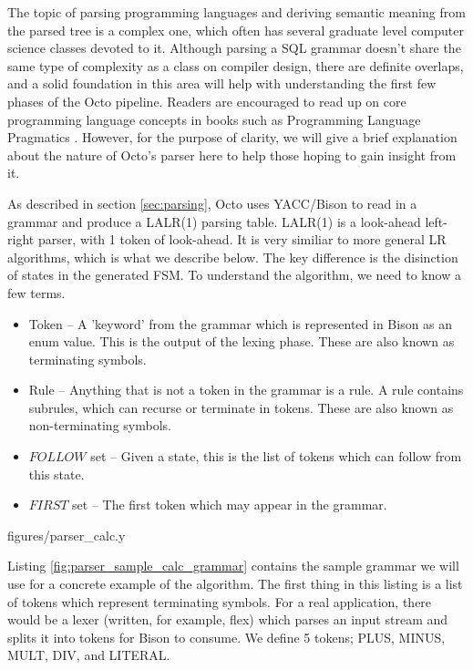 \documentclass[]{article}
\begin{document}
The topic of parsing programming languages and deriving semantic meaning from the parsed tree is a complex one, which often has several graduate level computer science classes devoted to it.
Although parsing a SQL grammar doesn't share the same type of complexity as a class on compiler design, there are definite overlaps, and a solid foundation in this area will help with understanding the first few phases of the Octo pipeline.
Readers are encouraged to read up on core programming language concepts in books such as Programming Language Pragmatics \cite{scott2000programming}.
However, for the purpose of clarity, we will give a brief explanation about the nature of Octo's parser here to help those hoping to gain insight from it.

As described in section \ref{sec:parsing}, Octo uses YACC/Bison to read in a grammar and produce a LALR(1) parsing table.
LALR(1) is a look-ahead left-right parser, with 1 token of look-ahead.
It is very similiar to more general LR algorithms, which is what we describe below.
The key difference is the disinction of states in the generated FSM.
To understand the algorithm, we need to know a few terms.

\begin{itemize}
	\item Token -- A 'keyword' from the grammar which is represented in Bison as an enum value. This is the output of the lexing phase. These are also known as terminating symbols.
	\item Rule -- Anything that is not a token in the grammar is a rule. A rule contains subrules, which can recurse or terminate in tokens. These are also known as non-terminating symbols.
	\item $FOLLOW$ set -- Given a state, this is the list of tokens which can follow from this state.
	\item $FIRST$ set -- The first token which may appear in the grammar.
\end{itemize}


{figures/parser_calc.y}

Listing \ref{fig:parser_sample_calc_grammar} contains the sample grammar we will use for a concrete example of the algorithm.
The first thing in this listing is a list of tokens which represent terminating symbols.
For a real application, there would be a lexer (written, for example, flex) which parses an input stream and splits it into tokens for Bison to consume.
We define 5 tokens; PLUS, MINUS, MULT, DIV, and LITERAL.
\end{document}
